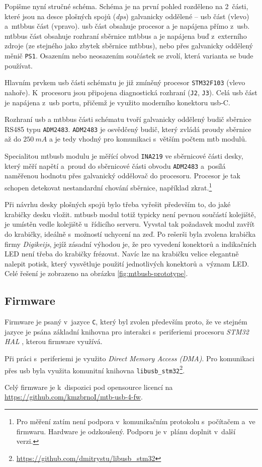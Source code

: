 Popišme nyní stručné schéma. Schéma je na první pohled rozděleno na 2~části,
které jsou na desce plošných spojů (\textit{\gls{dps}}) galvanicky oddělené –
\gls{usb} část (vlevo) a~\gls{mtbbus} část (vpravo). \gls{usb} část obsahuje
procesor a je napájena přímo z~\gls{usb}. \gls{mtbbus} část obsahuje rozhraní
sběrnice \gls{mtbbus} a je napájena buď z~externího zdroje (ze stejného jako
zbytek sběrnice \gls{mtbbus}), nebo přes galvanicky oddělený měnič \texttt{PS1}.
Osazením nebo neosazením součástek se zvolí, která varianta se bude používat.

Hlavním prvkem \gls{usb} části schématu je již zmíněný procesor
\texttt{STM32F103} (vlevo nahoře). K~procesoru jsou připojena diagnostická
rozhraní (\texttt{J2}, \texttt{J3}). Celá \gls{usb} část je napájena z~\gls{usb}
portu, přičemž je využito moderního konektoru \gls{usb}-C.

Rozhraní \gls{usb} a \gls{mtbbus} části schématu tvoří galvanicky oddělený
budič sběrnice RS485 typu \texttt{ADM2483}. \texttt{ADM2483} je osvědčený budič,
který zvládá proudy sběrnice až do $250~mA$ \cite{adm2483-datasheet} a je tedy
vhodný pro komunikaci s~větším počtem \gls{mtb} modulů.

Specialitou \gls{mtbusb} modulu je měřící obvod \texttt{INA219} ve sběrnicové
části desky, který měří napětí a~proud do sběrnicové části obvodu
\texttt{ADM2483} a~posílá naměřenou hodnotu přes galvanický oddělovač do
procesoru. Procesor je tak schopen detekovat nestandardní chování sběrnice,
například zkrat.\footnote{Pro měření zatím není podpora v~komunikačním
protokolu s~počítačem a~ve firmwaru. Hardware je odzkoušený. Podporu je v~plánu
doplnit v~další verzi.}

Při návrhu desky plošných spojů bylo třeba vyřešit především to, do jaké
krabičky desku vložit. \gls{mtbusb} modul totiž typicky není pevnou součástí
kolejiště, je umístěn vedle kolejiště u~řídicího serveru. Vyvstal tak požadavek
modul zavřít do krabičky, ideálně s~možností uchycení na zeď. Po rešerši byla
zvolena krabička firmy \textit{Digikeijs}, jejíž zásadní výhodou je, že pro
vyvedení konektorů a indikačních LED není třeba do krabičky frézovat. Navíc lze
na krabičku velice elegantně nalepit potisk, který vysvětluje použití
jednotlivých konektorů a~význam LED. Celé řešení je zobrazeno na
obrázku \ref{fig:mtbusb-prototype}.


\subsection{Firmware}

Firmware je psaný v~jazyce \texttt{C}, který byl zvolen především proto, že ve
stejném jazyce je psána základní knihovna pro interakci s~periferiemi procesoru
\textit{STM32 HAL} \cite{stm32-hal}, kterou firmware využívá.

Při práci s~periferiemi je využito \textit{Direct Memory Access (DMA)}. Pro
komunikaci přes \gls{usb} byla využita komunitní knihovna
\texttt{libusb\_stm32}\footnote{\url{https://github.com/dmitrystu/libusb_stm32}}.

Celý firmware je k~dispozici pod opensource licencí na
\url{https://github.com/kmzbrnoI/mtb-usb-4-fw}.
